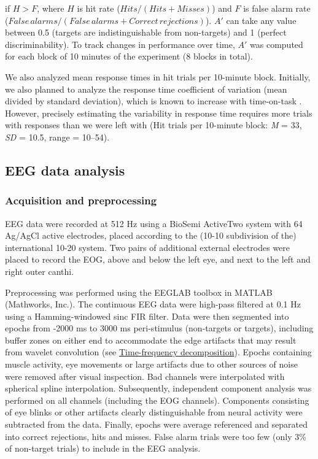 \documentclass[11pt,english,]{memoir}
\begin{document}
\noindent if \(H > F\), where \(H\) is hit rate (\(Hits / (Hits + Misses)\)) and \(F\) is false alarm rate (\(False\, alarms / (False\, alarms + Correct\, rejections)\)). \(A'\) can take any value between 0.5 (targets are indistinguishable from non-targets) and 1 (perfect discriminability). To track changes in performance over time, \(A'\) was computed for each block of 10 minutes of the experiment (8 blocks in total).

We also analyzed mean response times in hit trials per 10-minute block. Initially, we also planned to analyze the response time coefficient of variation (mean divided by standard deviation), which is known to increase with time-on-task \autocites{Esterman2013}{VanDenBrink2016}. However, precisely estimating the variability in response time requires more trials with responses than we were left with (Hit trials per 10-minute block: \emph{M} = 33, \emph{SD} = 10.5, range = 10--54).

\hypertarget{eeg-data-analysis}{%
\subsection{EEG data analysis}\label{eeg-data-analysis}}

\hypertarget{acquisition-and-preprocessing}{%
\subsubsection{Acquisition and preprocessing}\label{acquisition-and-preprocessing}}

EEG data were recorded at 512 Hz using a BioSemi ActiveTwo system with 64 Ag/AgCl active electrodes, placed according to the (10-10 subdivision of the) international 10-20 system. Two pairs of additional external electrodes were placed to record the EOG, above and below the left eye, and next to the left and right outer canthi.

Preprocessing was performed using the EEGLAB toolbox \autocite{Delorme2004} in MATLAB (Mathworks, Inc.). The continuous EEG data were high-pass filtered at 0.1 Hz using a Hamming-windowed sinc FIR filter. Data were then segmented into epochs from -2000 ms to 3000 ms peri-stimulus (non-targets or targets), including buffer zones on either end to accommodate the edge artifacts that may result from wavelet convolution (see \protect\hyperlink{time-frequency-decomposition}{Time-frequency decomposition}). Epochs containing muscle activity, eye movements or large artifacts due to other sources of noise were removed after visual inspection. Bad channels were interpolated with spherical spline interpolation. Subsequently, independent component analysis was performed on all channels (including the EOG channels). Components consisting of eye blinks or other artifacts clearly distinguishable from neural activity were subtracted from the data. Finally, epochs were average referenced and separated into correct rejections, hits and misses. False alarm trials were too few (only 3\% of non-target trials) to include in the EEG analysis.
\end{document}

